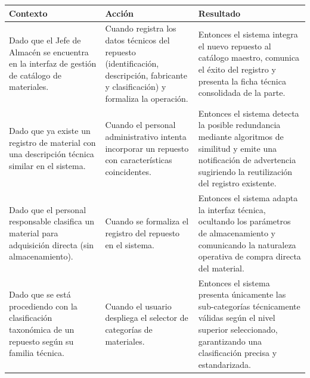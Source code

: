\footnotesize\begin{longtable}{|p{0.28\textwidth}|p{0.32\textwidth}|p{0.34\textwidth}|}\hline
\textbf{Contexto} & \textbf{Acción} & \textbf{Resultado} \\ \hline
\parbox[t]{\linewidth}{Dado que el Jefe de Almacén se encuentra en la interfaz de gestión de catálogo de materiales.} & \parbox[t]{\linewidth}{Cuando registra los datos técnicos del repuesto (identificación, descripción, fabricante y clasificación) y formaliza la operación.} & \parbox[t]{\linewidth}{Entonces el sistema integra el nuevo repuesto al catálogo maestro, comunica el éxito del registro y presenta la ficha técnica consolidada de la parte.} \\ \hline
\parbox[t]{\linewidth}{Dado que ya existe un registro de material con una descripción técnica similar en el sistema.} & \parbox[t]{\linewidth}{Cuando el personal administrativo intenta incorporar un repuesto con características coincidentes.} & \parbox[t]{\linewidth}{Entonces el sistema detecta la posible redundancia mediante algoritmos de similitud y emite una notificación de advertencia sugiriendo la reutilización del registro existente.} \\ \hline
\parbox[t]{\linewidth}{Dado que el personal responsable clasifica un material para adquisición directa (sin almacenamiento).} & \parbox[t]{\linewidth}{Cuando se formaliza el registro del repuesto en el sistema.} & \parbox[t]{\linewidth}{Entonces el sistema adapta la interfaz técnica, ocultando los parámetros de almacenamiento y comunicando la naturaleza operativa de compra directa del material.} \\ \hline
\parbox[t]{\linewidth}{Dado que se está procediendo con la clasificación taxonómica de un repuesto según su familia técnica.} & \parbox[t]{\linewidth}{Cuando el usuario despliega el selector de categorías de materiales.} & \parbox[t]{\linewidth}{Entonces el sistema presenta únicamente las sub-categorías técnicamente válidas según el nivel superior seleccionado, garantizando una clasificación precisa y estandarizada.} \\ \hline
\end{longtable}\normalsize
\vspace{1em}